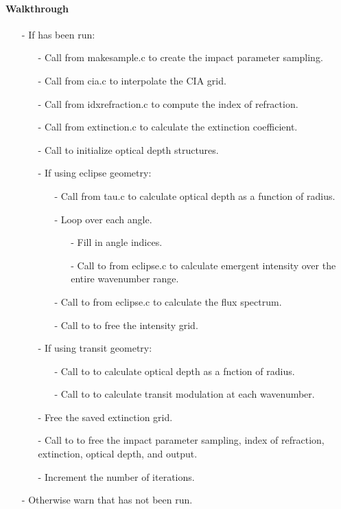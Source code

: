 \documentclass[letterpaper,12pt]{article}
\begin{document}
\paragraph{Walkthrough}
\begin{enumerate}[leftmargin=10pt, noitemsep, parsep=0pt, topsep=0ex]
\item[-] If  has been run:
\begin{enumerate}[leftmargin=10pt, noitemsep, parsep=0pt, topsep=0ex]
\item[-] Call  from makesample.c to create the impact parameter sampling.
\item[-] Call  from cia.c to interpolate the CIA grid.
\item[-] Call  from idxrefraction.c to compute the index of refraction.
\item[-] Call  from extinction.c to calculate the extinction coefficient.
\item[-] Call  to initialize optical depth structures.
\item[-] If using eclipse geometry:
\begin{enumerate}[leftmargin=10pt, noitemsep, parsep=0pt, topsep=0ex]
\item[-] Call  from tau.c to calculate optical depth as a function of radius.
\item[-] Loop over each angle.
\begin{enumerate}[leftmargin=10pt, noitemsep, parsep=0pt, topsep=0ex]
\item[-] Fill in angle indices.
\item[-] Call to  from eclipse.c to calculate emergent intensity over the entire wavenumber range.
\end{enumerate}
\item[-] Call to  from eclipse.c to calculate the flux spectrum.
\item[-] Call to  to free the intensity grid.
\end{enumerate}
\item[-] If using transit geometry:
\begin{enumerate}[leftmargin=10pt, noitemsep, parsep=0pt, topsep=0ex]
\item[-] Call to  to calculate optical depth as a fnction of radius.
\item[-] Call to  to calculate transit modulation at each wavenumber.
\end{enumerate}
\item[-] Free the saved extinction grid.
\item[-] Call to  to free the impact parameter sampling, index of refraction, extinction, optical depth, and output.
\item[-] Increment the number of iterations.
\end{enumerate}
\item[-] Otherwise warn that  has not been run.
\end{enumerate}
\end{document}
